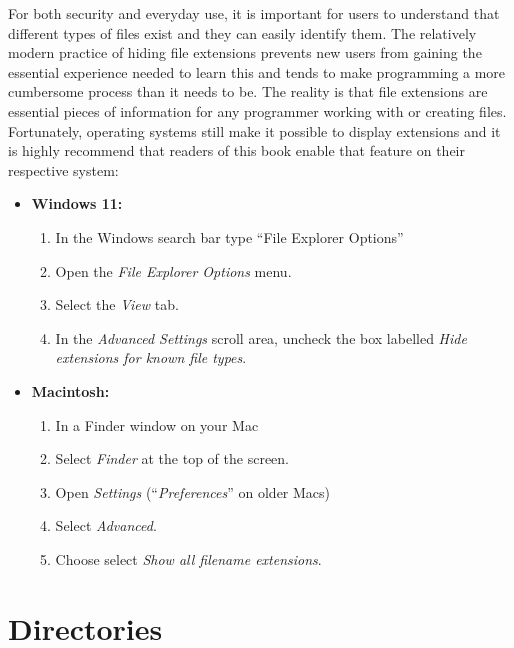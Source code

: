 For both security and everyday use, it is important for users to understand that different types of files exist and they can easily identify them. The relatively modern practice of hiding file extensions prevents new users from gaining the essential experience needed to learn this and tends to make programming a more cumbersome process than it needs to be. The reality is that file extensions are essential pieces of information for any programmer working with or creating files. Fortunately, operating systems still make it possible to display extensions and it is highly recommend that readers of this book enable that feature on their respective system:

\begin{itemize}
    \item \textbf{Windows 11:} 
    \begin{enumerate}
    \sffamily\setlength\itemsep{-1em}
        \item In the Windows search bar type ``File Explorer Options''
        \item Open the \textit{File Explorer Options} menu. 
        \item Select the \textit{View} tab. 
        \item In the \textit{Advanced Settings} scroll area, uncheck the box labelled \textit{Hide extensions for known file types}.
    \end{enumerate}

    \item \textbf{Macintosh:} 
    \begin{enumerate}
    \sffamily\setlength\itemsep{-1em}
        \item In a Finder window on your Mac
        \item Select \textit{Finder} at the top of the screen.
        \item Open \textit{Settings} (``\textit{Preferences}'' on older Macs)
        \item Select \textit{Advanced}. 
        \item Choose select \textit{Show all filename extensions}.
    \end{enumerate}

\end{itemize}


\section{Directories}
\label{sec:dir}

